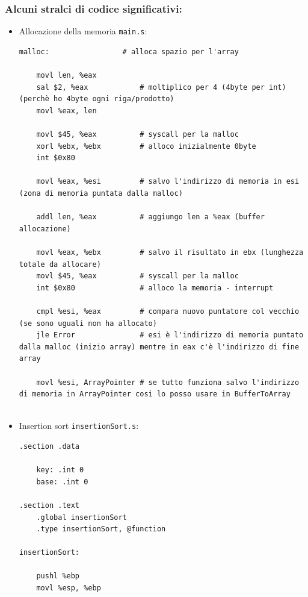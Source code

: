 \documentclass[a4paper]{report}
\begin{document}
\subsubsection{Alcuni stralci di codice significativi:}

  \begin{itemize}
    \item Allocazione della memoria \texttt{main.s}:
    \begin{lstlisting}[firstnumber=130]
    malloc:                 # alloca spazio per l'array

    movl len, %eax
    sal $2, %eax            # moltiplico per 4 (4byte per int) (perchè ho 4byte ogni riga/prodotto)     
    movl %eax, len

    movl $45, %eax          # syscall per la malloc
    xorl %ebx, %ebx         # alloco inizialmente 0byte
    int $0x80   
    
    movl %eax, %esi         # salvo l'indirizzo di memoria in esi (zona di memoria puntata dalla malloc)
    
    addl len, %eax          # aggiungo len a %eax (buffer allocazione)
                                                              
    movl %eax, %ebx         # salvo il risultato in ebx (lunghezza totale da allocare)
    movl $45, %eax          # syscall per la malloc
    int $0x80               # alloco la memoria - interrupt
    
    cmpl %esi, %eax         # compara nuovo puntatore col vecchio (se sono uguali non ha allocato)
    jle Error               # esi è l'indirizzo di memoria puntato dalla malloc (inizio array) mentre in eax c'è l'indirizzo di fine array
    
    movl %esi, ArrayPointer # se tutto funziona salvo l'indirizzo di memoria in ArrayPointer cosi lo posso usare in BufferToArray
    
    \end{lstlisting}
    
    \item Insertion sort \texttt{insertionSort.s}:
    \begin{lstlisting}[firstnumber=130]
      .section .data

    key: .int 0
    base: .int 0

.section .text 
    .global insertionSort
    .type insertionSort, @function

insertionSort:

    pushl %ebp
    movl %esp, %ebp


\end{lstlisting}
\end{itemize}
\end{document}
